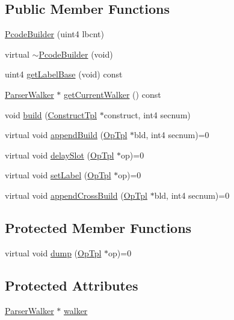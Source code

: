 \subsection*{Public Member Functions}
\begin{DoxyCompactItemize}
\item 
\mbox{\hyperlink{class_pcode_builder_af1c62eec00ca64be050b63f6da68a815}{Pcode\+Builder}} (uint4 lbcnt)
\item 
virtual \mbox{\hyperlink{class_pcode_builder_ae547ef047c8ef1fd280d10c4f39e1097}{$\sim$\+Pcode\+Builder}} (void)
\item 
uint4 \mbox{\hyperlink{class_pcode_builder_a3323d18944e86830774bfc49a0821dd0}{get\+Label\+Base}} (void) const
\item 
\mbox{\hyperlink{class_parser_walker}{Parser\+Walker}} $\ast$ \mbox{\hyperlink{class_pcode_builder_a65861c5e4b12ae6704376d38e4b15fc0}{get\+Current\+Walker}} () const
\item 
void \mbox{\hyperlink{class_pcode_builder_a0d27ac650805e617aa50c28da6d49c07}{build}} (\mbox{\hyperlink{class_construct_tpl}{Construct\+Tpl}} $\ast$construct, int4 secnum)
\item 
virtual void \mbox{\hyperlink{class_pcode_builder_aa5c50ed5c414075e71fee8d31a976608}{append\+Build}} (\mbox{\hyperlink{class_op_tpl}{Op\+Tpl}} $\ast$bld, int4 secnum)=0
\item 
virtual void \mbox{\hyperlink{class_pcode_builder_a229a55795ad8c72be40f1d2125751035}{delay\+Slot}} (\mbox{\hyperlink{class_op_tpl}{Op\+Tpl}} $\ast$op)=0
\item 
virtual void \mbox{\hyperlink{class_pcode_builder_aadc0f772375e7c05ecd11ea145d61df2}{set\+Label}} (\mbox{\hyperlink{class_op_tpl}{Op\+Tpl}} $\ast$op)=0
\item 
virtual void \mbox{\hyperlink{class_pcode_builder_ab8214b4b69aea45b459b1a37c1c2aa77}{append\+Cross\+Build}} (\mbox{\hyperlink{class_op_tpl}{Op\+Tpl}} $\ast$bld, int4 secnum)=0
\end{DoxyCompactItemize}
\subsection*{Protected Member Functions}
\begin{DoxyCompactItemize}
\item 
virtual void \mbox{\hyperlink{class_pcode_builder_afda63f1d79357bca4e63e92bded60559}{dump}} (\mbox{\hyperlink{class_op_tpl}{Op\+Tpl}} $\ast$op)=0
\end{DoxyCompactItemize}
\subsection*{Protected Attributes}
\begin{DoxyCompactItemize}
\item 
\mbox{\hyperlink{class_parser_walker}{Parser\+Walker}} $\ast$ \mbox{\hyperlink{class_pcode_builder_af47adb151a448ebd175f638f03d17a28}{walker}}
\end{DoxyCompactItemize}


